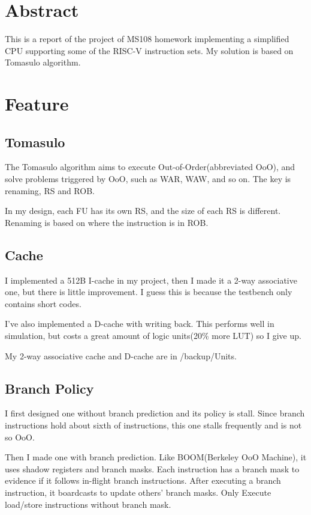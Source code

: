 \documentclass[12pt,letterpaper]{article}
\begin{document}
\section{Abstract}
    This is a report of the project of MS108 homework implementing a simplified CPU supporting some of the RISC-V instruction sets. 
    My solution is based on Tomasulo algorithm. 
\section{Feature}
\subsection{Tomasulo}
    The Tomasulo algorithm aims to execute Out-of-Order(abbreviated OoO), 
    and solve problems triggered by OoO, such as WAR, WAW, and so on. The key is renaming, 
    RS and ROB. 

    In my design, each FU has its own RS, and the size of each RS is different. 
    Renaming is based on where the instruction is in ROB. 
\subsection{Cache}
    I implemented a 512B I-cache in my project, then I made it a 2-way associative one, but there is little improvement. 
    I guess this is because the testbench only contains short codes. 

    I've also implemented a D-cache with writing back. This performs well in simulation, 
    but costs a great amount of logic units(20\% more LUT) so I give up. 

    My 2-way associative cache and D-cache are in /backup/Units. 
\subsection{Branch Policy}
    I first designed one without branch prediction and its policy is stall. Since branch instructions hold about sixth of instructions, 
    this one stalls frequently and is not so OoO. 

    Then I made one with branch prediction. Like BOOM(Berkeley OoO Machine), it uses shadow registers and branch masks. 
    Each instruction has a branch mask to evidence if it follows in-flight branch instructions. After executing a branch instruction, 
    it boardcasts to update others' branch masks. Only Execute load/store instructions without branch mask. 
    
\end{document}

